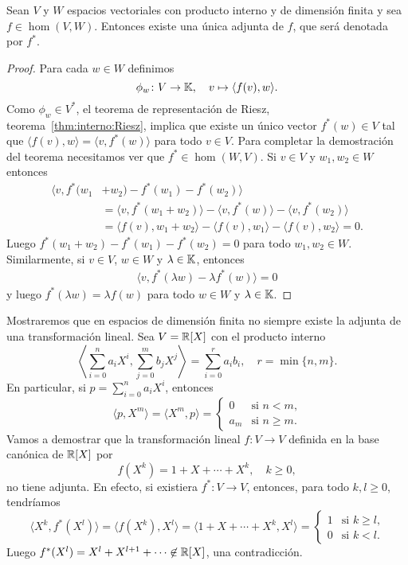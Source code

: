 \begin{thm}
    \label{thm:adjunta:existencia}
    Sean $V$ y $W$ espacios vectoriales con producto interno y de dimensión
    finita y sea $f\in\hom(V,W)$. Entonces existe una única adjunta de $f$, que
    será denotada por $f^*$. 

	\begin{proof}
		Para cada $w\in W$ definimos 
		\[
			\phi_w\colon V\to\mathbb{K},
			\quad
			v\mapsto\langle f(v),w\rangle.
		\]
		Como $\phi_w\in V^*$, el teorema de representación de Riesz,
		teorema~\ref{thm:interno:Riesz}, implica que existe un único vector
		$f^*(w)\in V$ tal que $\langle f(v),w\rangle=\langle v,f^*(w)\rangle$ para todo $v\in V$.
		Para completar la demostración del teorema necesitamos ver que
		$f^*\in\hom(W,V)$. Si $v\in V$ y $w_1,w_2\in W$ entonces
		\begin{align*}
			\langle v,f^*(w_1&+w_2)-f^*(w_1)-f^*(w_2)\rangle\\
			&=\langle v,f^*(w_1+w_2)\rangle-\langle v,f^*(w)\rangle-\langle v,f^*(w_2)\rangle\\
			&=\langle f(v),w_1+w_2\rangle-\langle f(v),w_1\rangle-\langle f(v),w_2\rangle=0.
		\end{align*}
		Luego $f^*(w_1+w_2)-f^*(w_1)-f^*(w_2)=0$
        para todo $w_1,w_2\in W$.
        Similarmente, si $v\in V$, $w\in W$ y
		$\lambda\in\mathbb{K}$, entonces 
		\begin{align*}
			\langle v,f^*(\lambda w)-\lambda f^*(w)\rangle=0
		\end{align*}
		y luego $f^*(\lambda w)=\lambda f(w)$ para todo $w\in W$ y $\lambda\in\mathbb{K}$. 
	\end{proof}
\end{thm}

\begin{example}
	Mostraremos que en espacios de dimensión finita no siempre existe la
	adjunta de una transformación lineal. Sea $V=\mathbb{R}[X]$ con el producto interno 
    \[
        \left\langle \sum_{i=0}^na_iX^i,\sum_{j=0}^mb_jX^j\right\rangle=\sum_{i=0}^{r}a_ib_i,
        \quad
        r=\min\{n,m\}.
    \]
    En particular, si $p=\sum_{i=0}^na_iX^i$, entonces 
    \[
        \langle p,X^m\rangle=\langle X^m,p\rangle=\begin{cases}
            0 & \text{si $n< m$,}\\
            a_m & \text{si $n\geq m$}.
        \end{cases}
    \]
    Vamos a demostrar que la transformación lineal $f\colon V\to V$ definida en
    la base canónica de $\mathbb{R}[X]$ por
    \[
        f(X^k)=1+X+\cdots+X^k,\quad k\geq0,
    \]
    no tiene adjunta. En efecto, si existiera $f^*\colon V\to V$, entonces,
    para todo $k,l\geq0$, tendríamos
    \[
        \langle X^k, f^*(X^l)\rangle
        =\langle f(X^k),X^l\rangle
        =\langle 1+X+\cdots+X^k,X^l\rangle
        =\begin{cases}
            1 & \text{si $k\geq l$,}\\
            0 & \text{si $k<l$.}
        \end{cases}
    \]
    Luego $f^*(X^l)=X^l+X^{l+1}+\cdots\not\in\mathbb{R}[X]$, una contradicción.
\end{example}

